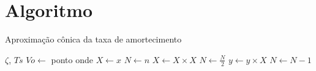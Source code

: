 \chapter{Algoritmo}

\begin{algorithm}[hbt!]
  \caption{Aproximação cônica da taxa de amortecimento}\label{alg:cap}
  \begin{algorithmic}[1]
  \Require $\zeta$, $Ts$
  \State $Vo \gets $ ponto onde
  \State $X \gets x$
  \State $N \gets n$
    \State $X \gets X \times X$
    \State $N \gets \frac{N}{2} $  
    \State $y \gets y \times X$
    \State $N \gets N - 1$
  \EndIf
  \EndWhile
  \end{algorithmic}
  \end{algorithm}